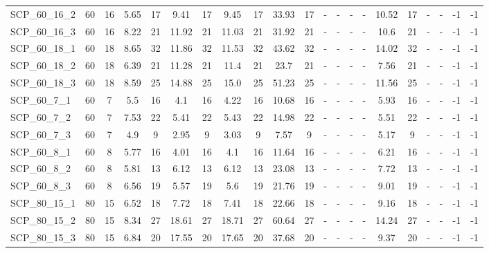 \begin{sidewaystable}[!ht]
{\begin{tabular}{lcccccccccccccccccccc}
SCP\_60\_16\_2 & 60 & 16 &  \textcolor{blue2}{5.65} & 17 & 9.41 & 17 & 9.45 & 17 & 33.93 & 17 &  - &  - &  - &  - & 10.52 & 17 &  - &  - & -1 & -1 \\
SCP\_60\_16\_3 & 60 & 16 &  \textcolor{blue2}{8.22} & 21 & 11.92 & 21 & 11.03 & 21 & 31.92 & 21 &  - &  - &  - &  - & 10.6 & 21 &  - &  - & -1 & -1 \\
SCP\_60\_18\_1 & 60 & 18 &  \textcolor{blue2}{8.65} & 32 & 11.86 & 32 & 11.53 & 32 & 43.62 & 32 &  - &  - &  - &  - & 14.02 & 32 &  - &  - & -1 & -1 \\
SCP\_60\_18\_2 & 60 & 18 &  \textcolor{blue2}{6.39} & 21 & 11.28 & 21 & 11.4 & 21 & 23.7 & 21 &  - &  - &  - &  - & 7.56 & 21 &  - &  - & -1 & -1 \\
SCP\_60\_18\_3 & 60 & 18 &  \textcolor{blue2}{8.59} & 25 & 14.88 & 25 & 15.0 & 25 & 51.23 & 25 &  - &  - &  - &  - & 11.56 & 25 &  - &  - & -1 & -1 \\
SCP\_60\_7\_1 & 60 & 7 & 5.5 & 16 &  \textcolor{blue2}{4.1} & 16 & 4.22 & 16 & 10.68 & 16 &  - &  - &  - &  - & 5.93 & 16 &  - &  - & -1 & -1 \\
SCP\_60\_7\_2 & 60 & 7 & 7.53 & 22 &  \textcolor{blue2}{5.41} & 22 & 5.43 & 22 & 14.98 & 22 &  - &  - &  - &  - & 5.51 & 22 &  - &  - & -1 & -1 \\
SCP\_60\_7\_3 & 60 & 7 & 4.9 & 9 &  \textcolor{blue2}{2.95} & 9 & 3.03 & 9 & 7.57 & 9 &  - &  - &  - &  - & 5.17 & 9 &  - &  - & -1 & -1 \\
SCP\_60\_8\_1 & 60 & 8 & 5.77 & 16 &  \textcolor{blue2}{4.01} & 16 & 4.1 & 16 & 11.64 & 16 &  - &  - &  - &  - & 6.21 & 16 &  - &  - & -1 & -1 \\
SCP\_60\_8\_2 & 60 & 8 &  \textcolor{blue2}{5.81} & 13 & 6.12 & 13 & 6.12 & 13 & 23.08 & 13 &  - &  - &  - &  - & 7.72 & 13 &  - &  - & -1 & -1 \\
SCP\_60\_8\_3 & 60 & 8 & 6.56 & 19 &  \textcolor{blue2}{5.57} & 19 & 5.6 & 19 & 21.76 & 19 &  - &  - &  - &  - & 9.01 & 19 &  - &  - & -1 & -1 \\
SCP\_80\_15\_1 & 80 & 15 &  \textcolor{blue2}{6.52} & 18 & 7.72 & 18 & 7.41 & 18 & 22.66 & 18 &  - &  - &  - &  - & 9.16 & 18 &  - &  - & -1 & -1 \\
SCP\_80\_15\_2 & 80 & 15 &  \textcolor{blue2}{8.34} & 27 & 18.61 & 27 & 18.71 & 27 & 60.64 & 27 &  - &  - &  - &  - & 14.24 & 27 &  - &  - & -1 & -1 \\
SCP\_80\_15\_3 & 80 & 15 &  \textcolor{blue2}{6.84} & 20 & 17.55 & 20 & 17.65 & 20 & 37.68 & 20 &  - &  - &  - &  - & 9.37 & 20 &  - &  - & -1 & -1 \\

\end{tabular}}
\end{sidewaystable}
